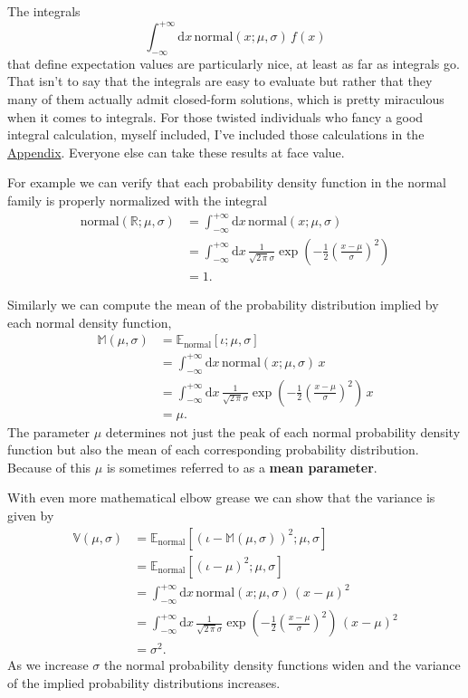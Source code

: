 \documentclass[
  letterpaper,
  DIV=11,
  numbers=noendperiod]{scrartcl}
\begin{document}
The integrals \[
\int_{-\infty}^{+\infty} \mathrm{d} x \,
\mathrm{normal}(x; \mu, \sigma) \, f(x)
\] that define expectation values are particularly nice, at least as far
as integrals go. That isn't to say that the integrals are easy to
evaluate but rather that they many of them actually admit closed-form
solutions, which is pretty miraculous when it comes to integrals. For
those twisted individuals who fancy a good integral calculation, myself
included, I've included those calculations in the
\href{@sec:appendix}{Appendix}. Everyone else can take these results at
face value.

For example we can verify that each probability density function in the
normal family is properly normalized with the integral \begin{align*}
\mathrm{normal}(\mathbb{R}; \mu, \sigma)
&=
\int_{-\infty}^{+\infty} \mathrm{d} x \,
\mathrm{normal}(x; \mu, \sigma)
\\
&=
\int_{-\infty}^{+\infty} \mathrm{d} x \,
\frac{1}{\sqrt{2 \, \pi} \sigma}
\exp \left( -\frac{1}{2} \left( \frac{x - \mu}{\sigma} \right)^{2} \right)
\\
&=
1.
\end{align*}

Similarly we can compute the mean of the probability distribution
implied by each normal density function, \begin{align*}
\mathbb{M}(\mu, \sigma)
&=
\mathbb{E}_{\mathrm{normal}}[ \iota; \mu, \sigma ]
\\
&=
\int_{-\infty}^{+\infty} \mathrm{d} x \,
\mathrm{normal}(x; \mu, \sigma) \, x
\\
&=
\int_{-\infty}^{+\infty} \mathrm{d} x \,
\frac{1}{\sqrt{2 \, \pi} \sigma}
\exp \left( -\frac{1}{2} \left( \frac{x - \mu}{\sigma} \right)^{2} \right)
\, x
\\
&=
\mu.
\end{align*} The parameter \(\mu\) determines not just the peak of each
normal probability density function but also the mean of each
corresponding probability distribution. Because of this \(\mu\) is
sometimes referred to as a \textbf{mean parameter}.

With even more mathematical elbow grease we can show that the variance
is given by \begin{align*}
\mathbb{V}(\mu, \sigma)
&=
\mathbb{E}_{\mathrm{normal}}[ (\iota - \mathbb{M}(\mu, \sigma))^{2}; \mu, \sigma ]
\\
&=
\mathbb{E}_{\mathrm{normal}}[ (\iota - \mu)^{2}; \mu, \sigma ]
\\
&=
\int_{-\infty}^{+\infty} \mathrm{d} x \,
\mathrm{normal}(x; \mu, \sigma) \, (x - \mu)^{2}
\\
&=
\int_{-\infty}^{+\infty} \mathrm{d} x \,
\frac{1}{\sqrt{2 \, \pi} \sigma}
\exp \left( -\frac{1}{2} \left( \frac{x - \mu}{\sigma} \right)^{2} \right)
\, (x - \mu)^{2}
\\
&=
\sigma^{2}.
\end{align*} As we increase \(\sigma\) the normal probability density
functions widen and the variance of the implied probability
distributions increases.
\end{document}
